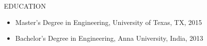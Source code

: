 \documentclass{resume} %
\begin{document}
\begin{rSection}{EDUCATION}
    \begin{flushleft}
    \begin{itemize}
                    \item Master's Degree in Engineering, University of Texas, TX, 2015 \\
                    \item Bachelor's Degree in Engineering, Anna University, India, 2013 \\
            \end{itemize}
    \end{flushleft}
\end{rSection}
\end{document}
